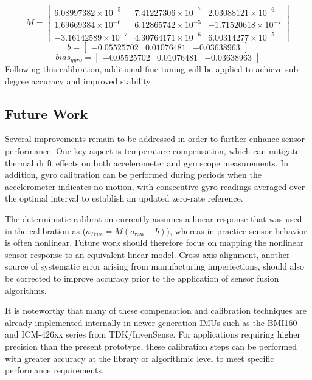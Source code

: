 \documentclass[10pt]{article}
\begin{document}
$$
M = \begin{bmatrix}
    6.08997382\times10^{-5}  & 7.41227306\times10^{-7}    & 2.03088121\times10^{-6} \\
    1.69669384\times10^{-6}  & 6.12865742\times10^{-5}  & -1.71520618\times10^{-7}\\
    -3.16142589\times10^{-7} & 4.30764171\times10^{-6}  & 6.00314277\times10^{-5}
\end{bmatrix}
$$
$$
b = \begin{bmatrix}
    -0.05525702 & 0.01076481 & -0.03638963
\end{bmatrix}
$$
$$
bias_{gyro} = \begin{bmatrix}
        -0.05525702  & 0.01076481  & -0.03638963
\end{bmatrix}
$$
Following this calibration, additional fine-tuning will be applied to achieve 
sub-degree accuracy and improved stability.


\subsection*{Future Work}
Several improvements remain to be addressed in order to further enhance sensor 
performance. One key aspect is temperature compensation, which can mitigate 
thermal drift effects on both accelerometer and gyroscope measurements. 
In addition, gyro calibration can be performed during periods when the 
accelerometer indicates no motion, with consecutive gyro readings averaged over 
the optimal interval to establish an updated zero-rate reference.  

The deterministic calibration currently assumes a linear response that was used
in the calibration as ($a_{True} = M (a_{\text{raw}} - b)$), whereas in practice sensor 
behavior is often nonlinear. Future work should therefore focus on mapping 
the nonlinear sensor response to an equivalent linear model. Cross-axis 
alignment, another source of systematic error arising from manufacturing 
imperfections, should also be corrected to improve accuracy prior to the 
application of sensor fusion algorithms.  

It is noteworthy that many of these compensation and calibration techniques 
are already implemented internally in newer-generation IMUs such as the BMI160 
and ICM-426xx series from TDK/InvenSense. For applications requiring higher 
precision than the present prototype, these calibration steps can be performed 
with greater accuracy at the library or algorithmic level to meet specific 
performance requirements.
\end{document}
